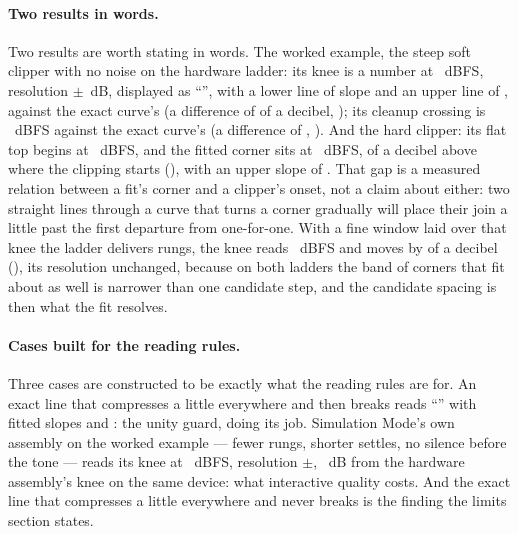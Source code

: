 \documentclass[11pt,a4paper]{article}
\begin{document}
\paragraph{Two results in words.} Two results are worth stating in words. The worked example, the steep
soft clipper with no noise on the hardware ladder: its knee is a number
at \cparityWorkedKnee{}~dBFS, resolution $\pm$\cparityWorkedKneeResolution{}~dB,
displayed as ``\cparityWorkedKneeLabel'', with a lower line of slope
\cparityWorkedPreSlope{} and an upper line of \cparityWorkedPostSlope{},
against the exact curve's \cparityWorkedTruthKnee{} (a difference of
\cparityWorkedKneeErrorWords{} of a decibel, \cparityWorkedKneeError{});
its cleanup crossing is \cparityWorkedCleanup{}~dBFS against the exact
curve's \cparityWorkedTruthCleanup{} (a difference of
\cparityWorkedCleanupErrorWords{}, \cparityWorkedCleanupError{}). And the
hard clipper: its flat top begins at \cparityClipOnset{}~dBFS, and the
fitted corner sits at \cparityClipKnee{}~dBFS,
\cparityClipKneeAboveOnsetWords{} of a decibel above where the clipping
starts (\cparityClipKneeAboveOnset{}), with an upper slope of
\cparityClipPostSlope{}. That gap is a measured relation between a fit's
corner and a clipper's onset, not a claim about either: two straight
lines through a curve that turns a corner gradually will place their
join a little past the first departure from one-for-one. With a fine
window laid over that knee the ladder delivers \cparityFineDelivered{}
rungs, the knee reads \cparityFineKnee{}~dBFS and moves by
\cparityFineKneeMoveWords{} of a decibel (\cparityFineKneeMove{}), its
resolution unchanged, because on both ladders the band of corners that
fit about as well is narrower than one candidate step, and the candidate
spacing is then what the fit resolves.

\paragraph{Cases built for the reading rules.} Three cases are constructed to be exactly what the reading rules are
for. An exact line that compresses a little everywhere and then breaks
reads ``\cparityBreakKnee'' with fitted slopes \cparityBreakPreSlope{} and
\cparityBreakPostSlope{}: the unity guard, doing its job. Simulation
Mode's own assembly on the worked example --- fewer rungs, shorter
settles, no silence before the tone --- reads its knee at
\cparitySimulationKnee{}~dBFS, resolution
$\pm$\cparitySimulationKneeResolution{}, \cparitySimulationKneeGap{}~dB
from the hardware assembly's knee on the same device: what interactive
quality costs. And the exact line that compresses a little everywhere
and never breaks is the finding the limits section states.
\end{document}
